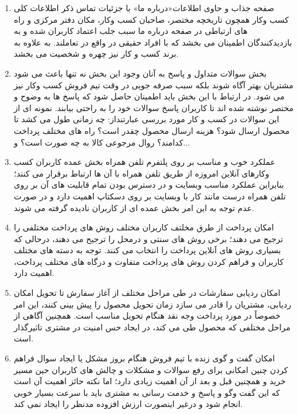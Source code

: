 \documentclass[14pt]{article}
\begin{document}
\begin{flushright}
\begin{enumerate}
\item صفحه جذاب و حاوی اطلاعات«درباره ما» با جزئیات تماس
\newline
ذکر اطلاعات کلی کسب وکار همچون تاریخچه مختصر، صاحبان کسب وکار، مکان دفتر مرکزی و راه های ارتباطی در صفحه درباره ما سبب جلب اعتماد کاربران شده و به بازدیدکنندگان اطمینان می بخشد که با افراد حقیقی در واقع در تعاملند. به علاوه به برند کسب و کار نیز چهره و شخصیت می بخشد.
\item بخش سوالات متداول و پاسخ به آنان
\newline
وجود این بخش نه تنها باعث می شود مشتریان بهتر آگاه شوند بلکه سبب صرفه جویی در وقت تیم فروش کسب وکار نیز می شود. در ارتباط با این بخش باید اطمینان حاصل شود که پاسخ ها به وضوح و مختصر نوشته شده اند تا کاربران پاسخ سوالات خود را به راحتی بیابند. نمونه ای از این سوالات در کسب و کار مورد بررسی عبارتنداز: چه زمانی طول می کشد تا محصول ارسال شود؟ هزینه ارسال محصول چقدر است؟ راه های مختلف پرداخت کدامند؟ روال مرجوعی کالا به چه صورت است؟ و...
\item عملکرد خوب و مناسب بر روی پلتفرم تلفن همراه
\newline
بخش عمده کاربران کسب وکارهای آنلاین امروزه از طریق تلفن همراه با آن ها ارتباط برقرار می کنند؛ بنابراین عملکرد مناسب وبسایت و در دسترس بودن تمام قابلیت های آن بر روی تلفن همراه درست مانند کار با وبسایت بر روی دسکتاپ اهمیت دارد و در صورت عدم توجه به این امر بخش عمده ای از کاربران نادیده گرفته می شوند.
\item امکان پرداخت از طرق مخلتف
\newline
کاربران مختلف روش های پرداخت مختلفی را ترجیح می دهند؛ برخی روش های سنتی و درمحل را ترجیح می دهند، درحالی که بسیاری روش های آنلاین پرداخت را انتخاب می کنند. توجه به دسته های مختلف کاربران و فراهم کردن روش های پرداخت متفاوت و درگاه های مختلف پرداخت،‌ اهمیت دارد.
\item امکان ردیابی سفارشات در طی مراحل مختلف از آغاز سفارش تا تحویل
\newline
امکان ردیابی، مشتریان را قادر می سازد زمان تحویل محصول را پیش بینی کنند، این امر خصوصاً در مورد پرداخت وجه نقد هنگام تحویل مناسب است. همچنین آگاهی از مراحل مختلفی که محصول طی می کند، در ایجاد حس امنیت در مشتری تاثیرگذار است.
\item امکان گفت و گوی زنده با تیم فروش هنگام بروز مشکل یا ایجاد سوال
\newline
فراهم کردن چنین امکانی برای رفع سوالات و مشکلات و چالش های کاربران حین مسیر خرید و همچنین قبل و بعد از آن اهمیت زیادی دارد؛ اما نکته حائز اهمیت آن است که این گفت وگو و پاسخ و خدمت رسانی به مشتری باید با سرعت بسیار خوبی انجام شود و درغیر اینصورت ارزش افزوده مدنظر را ایجاد نمی کند.

\end{enumerate}
\end{flushright}
\end{document}
